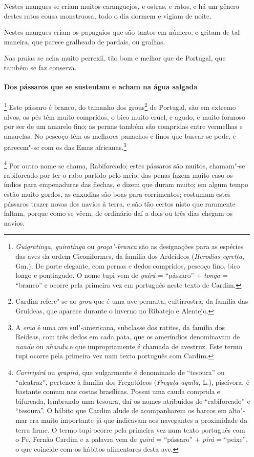  Nestes mangues se criam muitos caranguejos, e ostras, e ratos, e há um
gênero destes ratos cousa monstruosa, todo o dia dormem e vigiam de noite.

 Nestes mangues criam os papagaios que são tantos em número, e gritam de
tal maneira, que parece gralheado de pardais, ou gralhas.

 Nas praias se acha muito perrexil, tão bom e melhor que de Portugal, 
que também se faz conserva.


\paragraph{Dos pássaros que se sustentam e acham na água salgada}

\footnote{ \textit{Guigratinga,
guiratinga} ou \textit{graça"-branca} são as designações para as
espécies das aves da ordem Ciconiformes, da família dos Ardeídeos
(\textit{Herodias egretta}, Gm.). De porte elegante, com pernas e dedos
compridos, pescoço fino, bico longo e pontiagudo. O nome tupi vem de
\textit{guirá} = ``pássaro'' + \textit{tonga} = ``branco'' e ocorre pela
primeira vez em português neste texto de Cardim.} Este
pássaro é branco, do tamanho dos grous\footnote{ Cardim refere"-se ao
\textit{grou} que é uma ave pernalta, cultirrostra, da família das
Gruídeas, que aparece durante o inverno no Ribatejo e Alentejo.} de
Portugal, são em extremo alvos, os pés têm muito compridos, o bico
muito cruel, e agudo, e muito formoso por ser de um amarelo fino; as
pernas também são compridas entre vermelhas e amarelas. No pescoço têm
os melhores panachos e finos que buscar se pode, e parecem"-se com os
das Emas africanas.\footnote{ A \textit{ema} é uma ave sul"-americana,
subclasse dos ratites, da família dos Reídeas, com três dedos em cada
pata, que os ameríndios denominavam de \textit{nandu} ou
\textit{nhandu} e que impropriamente é chamada de avestruz. Este termo
tupi ocorre pela primeira vez num texto português com Cardim.} 

\footnote{ \textit{Cariripirá} ou \textit{grapirá}, 
que vulgarmente é denominado de ``tesoura'' ou ``alcatraz'', pertence à
família dos Fregatídeos (\textit{Fregata aquila}, L.), piscívora, é
bastante comum nas costas brasílicas. Possui uma cauda comprida e
bifurcada, lembrando uma tesoura, daí os nomes atribuídos de
``rabiforcado'' e ``tesoura''. O hábito que Cardim alude de acompanharem os
barcos em alto"-mar era muito importante já que indicavam aos navegantes
a proximidade da terra firme. O termo tupi ocorre pela primeira vez num
texto português com o Pe. Fernão Cardim e a palavra vem de
\textit{guirá} = ``pássaro'' + \textit{pirá} = ``peixe'', o que coincide
com os hábitos alimentares desta ave.} Por outro nome se
chama, Rabiforcado; estes pássaros são muitos, chamam"-se rabiforcado
por ter o rabo partido pelo meio; das penas fazem muito caso os índios
para empenaduras das flechas, e dizem que duram muito; em algum tempo
estão muito gordos, as enxudias são boas para corrimentos; costumam
estes pássaros trazer novas dos navios à terra, e são tão certos nisto
que raramente faltam, porque como se vêem, de ordinário daí a dois ou
três dias chegam os navios.

